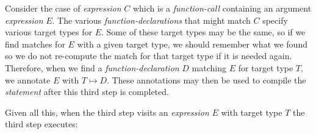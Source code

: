 \documentclass[12pt]{article}
\begin{document}
Consider the case of {\em expression} $C$ which is a {\em function-call}
containing an argument {\em expression} $E$.  The various
{\em function-declarations} that might match $C$ specify various
target types for $E$.  Some of these target types may be the same,
so if we find matches for $E$ with a given target type, we should
remember what we found so we do not re-compute the match for
that target type if it is needed again.  Therefore, when we find a
{\em function-declaration} $D$ matching $E$ for target type $T$, we annotate
$E$ with $T\mapsto D$.  These annotations may then be used to compile
the {\em statement} after this third step is completed.

Given all this, when the third step visits an {\em expression} $E$ with
target type $T$ the third step executes:


\bigskip
\end{document}

